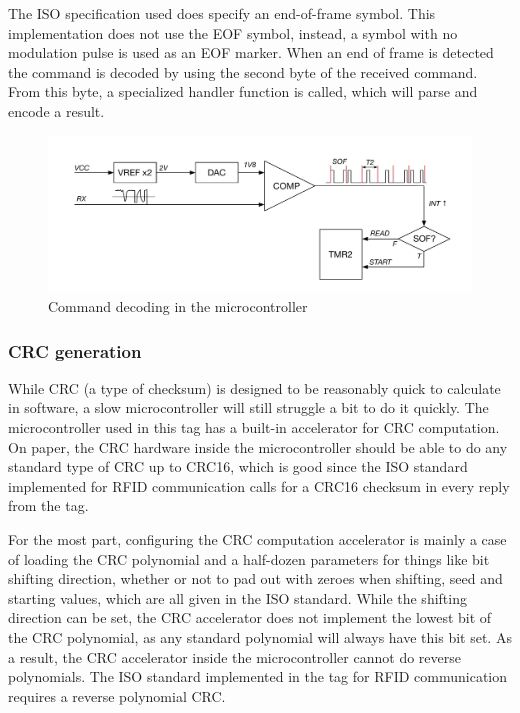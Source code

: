 The ISO specification used does specify an end-of-frame symbol. This implementation does not use
the EOF symbol, instead, a symbol with no modulation pulse is used as an EOF marker.
When an end of frame is detected the command is decoded by using the second byte of the received command.
From this byte, a specialized handler function is called, which will parse and encode a result.

\begin{figure}[h!]
    \centering
    \includegraphics[scale=0.5]{res/RX.pdf}
    \caption{Command decoding in the microcontroller}
    \label{fig:rx}
\end{figure}

\subsubsection{CRC generation}
While CRC (a type of checksum) is designed to be reasonably quick to calculate in software,
a slow microcontroller will still struggle a bit to do it quickly. The microcontroller used in this
tag has a built-in accelerator for CRC computation. On paper, the CRC hardware inside the microcontroller
should be able to do any standard type of CRC up to CRC16, which is good since the ISO standard
implemented for RFID communication calls for a CRC16 checksum in every reply from the tag.

For the most part, configuring the CRC computation accelerator is mainly a case of loading the
CRC polynomial and a half-dozen parameters for things like bit shifting direction, whether or not to pad
out with zeroes when shifting, seed and starting values, which are all given in the ISO standard.
While the shifting direction can be set, the CRC
accelerator does not implement the lowest bit of the CRC polynomial, as any standard polynomial will always have
this bit set. As a result, the CRC accelerator inside the microcontroller cannot do reverse polynomials.
The ISO standard implemented in the tag for RFID communication requires a reverse polynomial CRC.

